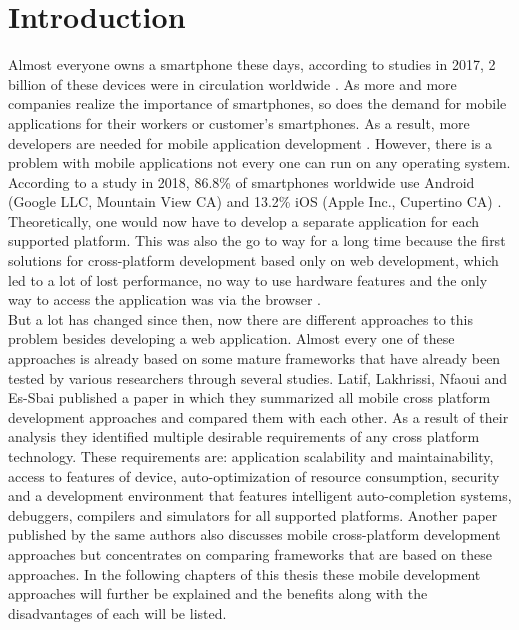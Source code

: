 \documentclass[Bachelor,BIF,english]{twbook}
\begin{document}
\chapter{Introduction}
Almost everyone owns a smartphone these days, according to studies in 2017, 2 billion of these devices were in circulation worldwide \cite[p.~184]{MartinezLecomte2017}. As more and more companies realize the importance of smartphones, so does the demand for mobile applications for their workers or customer's smartphones. As a result, more developers are needed for mobile application development \cite{GaouarBenamarBendimerad2016} \cite{Danielsson_2016}.
However, there is a problem with mobile applications not every one can run on any operating system. According to a study \cite{OSMarketShare} in 2018, 86.8\% of smartphones worldwide use Android (Google LLC, Mountain View CA) and 13.2\% iOS (Apple Inc., Cupertino CA) \cite[p.~5]{Steczko2016}. Theoretically, one would now have to develop a separate application for each supported platform. This was also the go to way for a long time because the first solutions for cross-platform development based only on web development, which led to a lot of lost performance, no way to use hardware features and the only way to access the application was via the browser \cite[p.~626]{6420693} \cite[p.~1]{7934674}.
\\[\baselineskip]
But a lot has changed since then, now there are different approaches to this problem besides developing a web application. Almost every one of these approaches is already based on some mature frameworks that have already been tested by various researchers through several studies. Latif, Lakhrissi, Nfaoui and Es-Sbai published a paper \cite{7479278} in which they summarized all mobile cross platform development approaches and compared them with each other. As a result of their analysis they identified multiple desirable requirements of any cross platform technology. These requirements are: application scalability and maintainability, access to features of device, auto-optimization of resource consumption, security and a development environment that features intelligent auto-completion systems, debuggers, compilers and simulators for all supported platforms. Another paper \cite{7934674} published by the same authors also discusses mobile cross-platform development approaches but concentrates on comparing frameworks that are based on these approaches. In the following chapters of this thesis these mobile development approaches will further be explained and the benefits along with the disadvantages of each will be listed.
\end{document}
